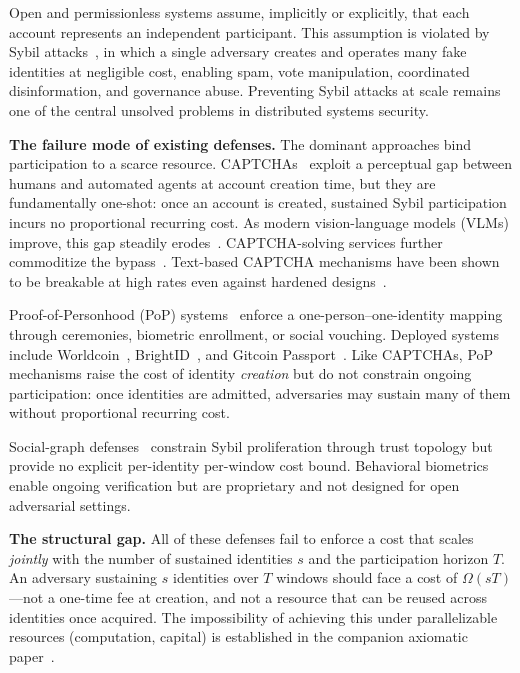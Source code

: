 \documentclass[11pt]{article}
\theoremstyle{remark}
\theoremstyle{plain}
\begin{document}
	Open and permissionless systems assume, implicitly or explicitly, that
	each account represents an independent participant. This assumption is
	violated by Sybil attacks~\cite{douceur2002sybil}, in which a single
	adversary creates and operates many fake identities at negligible cost,
	enabling spam, vote manipulation, coordinated disinformation, and
	governance abuse. Preventing Sybil attacks at scale remains one of
	the central unsolved problems in distributed systems security.
	
	\noindent\textbf{The failure mode of existing defenses.}
	The dominant approaches bind participation to a scarce resource.
	CAPTCHAs~\cite{vonahn2003captcha} exploit a perceptual gap between
	humans and automated agents at account creation time, but they are
	fundamentally one-shot: once an account is created, sustained Sybil
	participation incurs no proportional recurring cost. As modern
	vision-language models (VLMs) improve, this gap steadily
	erodes~\cite{sivakorn2016iam,ye2018yet,goodfellow2014multidigit}.
	CAPTCHA-solving services further commoditize the
	bypass~\cite{motoyama2010recaptchas}. Text-based CAPTCHA mechanisms
	have been shown to be breakable at high rates even against hardened
	designs~\cite{bursztein2011text}.
	
	Proof-of-Personhood (PoP) systems~\cite{borge2017proofofpersonhood,ford2020pseudonym}
	enforce a one-person--one-identity mapping through ceremonies, biometric
	enrollment, or social vouching. Deployed systems include
	Worldcoin~\cite{worldcoin2023}, BrightID~\cite{brightid2022}, and
	Gitcoin Passport~\cite{gitcoin2023}. Like CAPTCHAs, PoP mechanisms
	raise the cost of identity \emph{creation} but do not constrain ongoing
	participation: once identities are admitted, adversaries may sustain
	many of them without proportional recurring cost.
	
	Social-graph defenses~\cite{yu2006sybilguard,yu2008sybillimit,danezis2009sybilinfer,wang2013clickstream}
	constrain Sybil proliferation through trust topology but provide no
	explicit per-identity per-window cost bound. Behavioral
	biometrics~\cite{frank2013touchalytics,serwadda2013kids} enable ongoing
	verification but are proprietary and not designed for open adversarial
	settings.
	
	\noindent\textbf{The structural gap.}
	All of these defenses fail to enforce a cost that scales
	\emph{jointly} with the number of sustained identities $s$ and the
	participation horizon $T$. An adversary sustaining $s$ identities over
	$T$ windows should face a cost of $\Omega(sT)$---not a one-time fee at
	creation, and not a resource that can be reused across identities once
	acquired. The impossibility of achieving this under parallelizable
	resources (computation, capital) is established in the companion
	axiomatic paper~\cite{maleki2026geometry}.
	
\end{document}
